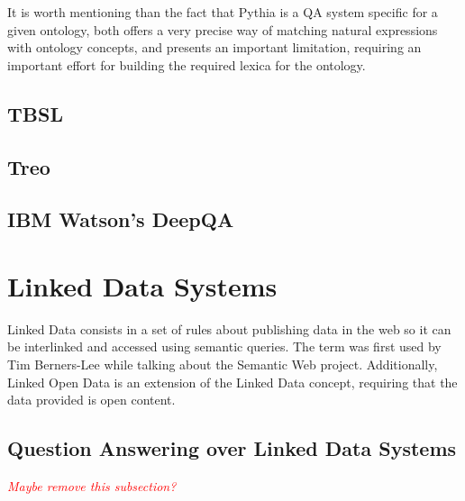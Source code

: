 
It is worth mentioning than the fact that Pythia is a \ac{QA} system specific for a given ontology, both offers a very precise way of matching natural expressions with ontology concepts, and presents an important limitation, requiring an important effort for building the required lexica for the ontology.

\subsection{TBSL}

\subsection{Treo}

\subsection{IBM Watson's DeepQA}

\section{Linked Data Systems}
\label{sec:linkd_sys}

Linked Data consists in a set of rules about publishing data in the web so it can be interlinked and accessed using semantic queries. The term was first used by Tim Berners-Lee while talking about the Semantic Web project. Additionally, Linked Open Data is an extension of the Linked Data concept, requiring that the data provided is open content.


\subsection{Question Answering over Linked Data Systems}
\label{subsec:qa_linked}

\emph{\textcolor{red}{Maybe remove this subsection?}}

